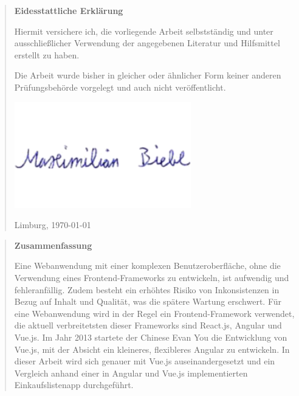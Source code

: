 \documentclass[%
    BCOR=8.25mm,         %
    DIV=12,              %
    parskip=half,                 %
    bibliography=totoc,     %
    headsepline=on,      %
]{scrbook}
\begin{document}
    \pagestyle{empty}
    \begin{quote}
        \vspace*{4cm}

        \begin{center}
            \textbf{\Large\sffamily Eidesstattliche Erklärung}
        \end{center}

        Hiermit versichere ich, die vorliegende Arbeit selbstständig und unter
        ausschließlicher Verwendung der angegebenen Literatur und Hilfsmittel
        erstellt zu haben.

        Die Arbeit wurde bisher in gleicher oder ähnlicher Form keiner anderen
        Prüfungsbehörde vorgelegt und auch nicht veröffentlicht.

        \vspace{2em}
        \includegraphics[scale=0.5]{img/signature}

        Limburg, \today
    \end{quote}
    \cleardoubleemptypage

    \pagestyle{empty}
    \begin{quote}
        \vspace*{4cm}

        \begin{center}
            \textbf{\Large\sffamily Zusammenfassung}
        \end{center}
        Eine Webanwendung mit einer komplexen Benutzeroberfläche, ohne die Verwendung eines Frontend-Frameworks zu entwickeln, ist aufwendig und fehleranfällig.
        Zudem besteht ein erhöhtes Risiko von Inkonsistenzen in Bezug auf Inhalt und Qualität, was die spätere Wartung erschwert.
        Für eine Webanwendung wird in der Regel ein Frontend-Framework verwendet, die aktuell verbreitetsten dieser Frameworks sind React.js, Angular und Vue.js.
        Im Jahr 2013 startete der Chinese Evan You die Entwicklung von Vue.js, mit der Absicht ein kleineres, flexibleres Angular zu entwickeln.
        In dieser Arbeit wird sich genauer mit Vue.js auseinandergesetzt und ein Vergleich anhand einer in Angular und Vue.js implementierten Einkaufslistenapp durchgeführt.
    \end{quote}
    \cleardoubleemptypage
\end{document}
